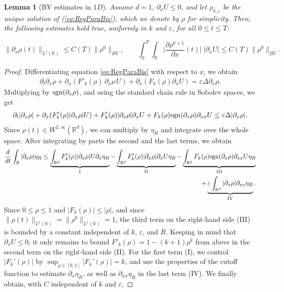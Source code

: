 \documentclass[11pt,twoside]{article}
\numberwithin{equation}{section}
\newcommand{\R}{\mathbb{R}}
\newcommand {\eps}  {\varepsilon}
\newcommand {\sgn} { {\rm sgn} }
\newcommand {\p}   {\partial}
\newtheorem{lemma}[theorem]{Lemma}
\begin{document}
\begin{lemma}[BV estimates in $1D$]
\label{Lemma1D}
Assume $d = 1$, $\p_xU \le0$, and let $\rho_{k,\eps}$ be the unique solution of (\ref{eq:RegParaBis}), which we denote by $\rho$ for simplicity. Then, the following estimates hold true, uniformly in $k$ and $\eps$, for all $0 \le t \le T$:

\[
\| \p_x \rho(t)\|_{L^1(\R)} \leq C(T)\|\rho^0\|_{BV}, \qquad \int_0^T \int_{\R} \big|\frac{\p \rho^{k+1}}{\p x }(t) \big|\;   \big|{\partial_x} U\big| \leq C(T)\|\rho^0\|_{BV}.
\]
\end{lemma}

\begin{proof}
Differentiating equation \eqref{eq:RegParaBis} with respect to $x$, we obtain
\begin{align*}
\partial_t \partial_x \rho + \partial_x(F'_k(\rho)\, \p_x\rho \, U) + \partial_x(F_k(\rho)\partial_x U) = \eps \Delta \p_x\rho.
\end{align*}
Multiplying by $\sgn(\partial_x \rho)$, and using the standard chain rule in Sobolev spaces, we get
\begin{align}
\label{eq:gradient_1D}
\p_t |\p_x \rho | + \p_x(F_k'(\rho)|\p_x \rho |U) + F_k'(\rho)|\p_x \rho |\p_x U + F_k(\rho)\sgn(\p_x\rho) \p_{xx} U \le \eps \Delta | \p_x\rho |.
\end{align}
Since $ \rho (t)\in W^{2,\infty}(\R^d)$, we can multiply by $\eta_R$ and integrate over the whole space. After integrating by parts the second and the last terms, we obtain
\begin{align*}
\frac{d}{dt} \int_{\R} |\p_x \rho |\eta_R \le \underbrace{\int_{\R^d} F_k'(\rho) |\p_x \rho | U \p_x \eta_R}_{\rm I}  - \underbrace{\int_{\R^d} F_k'(\rho)|\p_x \rho | \p_x U \eta_R}_{\rm II} - \underbrace{\int_{\R^d} F_k(\rho) \sgn(\p_x\rho) \p_{xx}U \eta_R}_{\rm III} \\
+ \underbrace{\eps \int_{\R^d} |\p_x \rho | \p_{xx} \eta_R}_{\rm IV}.
\end{align*}
Since $0 \le \rho \le 1$ and $|F_k(\rho)| \le |\rho|$, and since $\| \rho (t) \|_{L^1(\R)} = \| \rho^0 \|_{L^1(\R)}=1$, the third term on the right-hand side (\rm III) is bounded by a constant independent of $k$, $\eps$, and $R$. Keeping in mind that $\p_x U \le 0$, it only remains to bound $F'_k(\rho) = 1-(k+1)\rho^k$ from above in the second term on the right-hand side (\rm II). For the first term (\rm I), we control $|F_k'(\rho)|$ by $\sup_{\rho \in [0,1]} |F_k'(\rho)|= k$, and use the properties of the cutoff function to estimate $\p_x \eta_R$, as well as $\p_{xx}\eta_R$ in the last term (\rm IV). We finally obtain, with $C$ independent of $k$ and $\eps$,

\end{proof}
\end{document}
